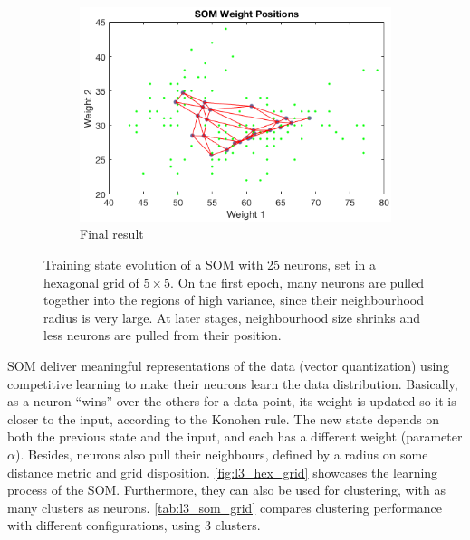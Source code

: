 \documentclass[a4paper, 10pt]{article}
\begin{document}
\begin{figure}[h]
\begin{adjustwidth}{-1cm}{-1cm}
\begin{subfigure}[t]{0.31\linewidth}
      \label{fig:l3_epoch1}
    \end{subfigure}
    \begin{subfigure}[t]{0.31\linewidth}
      \includegraphics[width=1\linewidth]{./lab3/SOM/epoch5_hex.png}
      \caption{Final result}
      \label{fig:l3_epoch5}
    \end{subfigure}
    \end{adjustwidth}
    \caption{Training state evolution of a SOM with 25 neurons, set in a 
    hexagonal grid of $5\times5$. On the first epoch, many neurons
    are pulled together into the regions of high variance, since their 
    neighbourhood radius is very large. At later stages, neighbourhood size 
    shrinks and less neurons are pulled from their position.}
    \label{fig:l3_hex_grid}
  \end{figure}

  SOM deliver meaningful representations of the data (vector quantization) using
  competitive learning to make their neurons learn the data distribution. 
  Basically, as a neuron “wins” over the others for a data point, its weight is
  updated so it is closer to the input, according to the Konohen rule. 
  The new state depends on both the previous state and the input, and each
  has a different weight (parameter $\alpha$). Besides, neurons also pull their
  neighbours, defined by a radius on some distance metric and grid disposition. 
  \autoref{fig:l3_hex_grid} showcases the learning process of the SOM. Furthermore,
  they can also be used for clustering, with as many clusters as neurons. 
  \autoref{tab:l3_som_grid} compares clustering performance with different 
  configurations, using 3 clusters.
\end{document}

